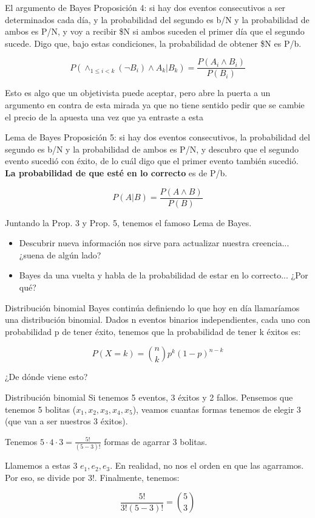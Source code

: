 \documentclass{beamer}
\begin{document}
\begin{frame}{El argumento de Bayes}
	Proposición 4: si hay dos eventos consecutivos a ser determinados cada día, y la probabilidad del segundo es b/N y la probabilidad de ambos es P/N, y voy a recibir \$N si ambos suceden el primer día que el segundo sucede. Digo que, bajo estas condiciones, la probabilidad de obtener \$N es P/b.

	$$P(\land_{1 \leq i < k} (\neg B_i) \land A_k | B_k) = \frac{P(A_i \land B_i)}{P(B_i)}$$

	Esto es algo que un objetivista puede aceptar, pero abre la puerta a un argumento en contra de esta mirada ya que no tiene sentido pedir que se cambie el precio de la apuesta una vez que ya entraste a esta
\end{frame}

\begin{frame}{Lema de Bayes}
	Proposición 5: si hay dos eventos consecutivos, la probabilidad del segundo es b/N y la probabilidad de ambos es P/N, y descubro que el segundo evento sucedió con éxito, de lo cuál digo que el primer evento también sucedió. \textbf{La probabilidad de que esté en lo correcto} es de P/b.\pause

	$$P(A | B) = \frac{P(A \land B)}{P(B)}$$

	Juntando la Prop. 3 y Prop. 5, tenemos el famoso Lema de Bayes.
	\pause

	\begin{itemize}
		\item Descubrir nueva información nos sirve para actualizar nuestra creencia... ¿suena de algún lado?\pause
		\item Bayes da una vuelta y habla de la probabilidad de estar en lo correcto... ¿Por qué?
	\end{itemize}
\end{frame}


\begin{frame}{Distribución binomial}
	Bayes continúa definiendo lo que hoy en día llamaríamos una distribución binomial. Dados n eventos binarios independientes, cada uno con probabilidad p de tener éxito, tenemos que la probabilidad de tener k éxitos es:
	
	$$P(X=k) = \binom{n}{k} p^k (1-p)^{n-k}$$
	
	¿De dónde viene esto?
\end{frame}

\begin{frame}{Distribución binomial}
	Si tenemos 5 eventos, 3 éxitos y 2 fallos. Pensemos que tenemos 5 bolitas ($x_1, x_2, x_3, x_4, x_5$), veamos cuantas formas tenemos de elegir 3 (que van a ser nuestros 3 éxitos).\pause
	
	Tenemos $5 \cdot 4 \cdot 3 = \frac{5!}{(5-3)!}$ formas de agarrar 3 bolitas.\pause

	Llamemos a estas 3 $e_1, e_2, e_3$. En realidad, no nos el orden en que las agarramos. Por eso, se divide por $3!$. Finalmente, tenemos:

	$$\frac{5!}{3!(5-3)!} = \binom{5}{3}$$
\end{frame}
\end{document}

